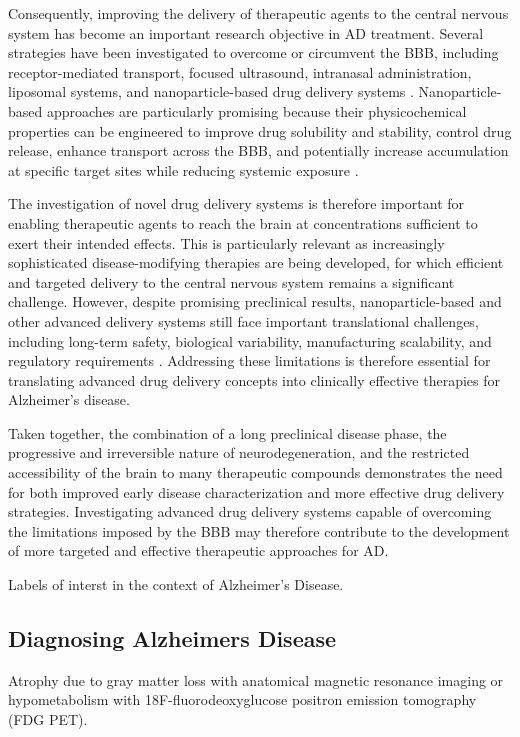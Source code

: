 Consequently, improving the delivery of therapeutic agents to the central nervous system has become an important research objective in AD treatment. Several strategies have been investigated to overcome or circumvent the BBB, including receptor-mediated transport, focused ultrasound, intranasal administration, liposomal systems, and nanoparticle-based drug delivery systems \cite{Iqbal_2024,DrugDelivery_BBB_AD_2025}. Nanoparticle-based approaches are particularly promising because their physicochemical properties can be engineered to improve drug solubility and stability, control drug release, enhance transport across the BBB, and potentially increase accumulation at specific target sites while reducing systemic exposure \cite{Roghani_2024,Roamcharern_2026}.

The investigation of novel drug delivery systems is therefore important for enabling therapeutic agents to reach the brain at concentrations sufficient to exert their intended effects. This is particularly relevant as increasingly sophisticated disease-modifying therapies are being developed, for which efficient and targeted delivery to the central nervous system remains a significant challenge. However, despite promising preclinical results, nanoparticle-based and other advanced delivery systems still face important translational challenges, including long-term safety, biological variability, manufacturing scalability, and regulatory requirements \cite{Roamcharern_2026}. Addressing these limitations is therefore essential for translating advanced drug delivery concepts into clinically effective therapies for Alzheimer’s disease.

Taken together, the combination of a long preclinical disease phase, the progressive and irreversible nature of neurodegeneration, and the restricted accessibility of the brain to many therapeutic compounds demonstrates the need for both improved early disease characterization and more effective drug delivery strategies. Investigating advanced drug delivery systems capable of overcoming the limitations imposed by the BBB may therefore contribute to the development of more targeted and effective therapeutic approaches for AD.


Labels of interst in the context of Alzheimer's Disease. 

\subsection{Diagnosing Alzheimers Disease}
\label{Diagnosing Alzheimers Disease}
Atrophy due to gray matter loss with anatomical magnetic resonance imaging or hypometabolism with 18F-fluorodeoxyglucose positron emission tomography (FDG PET). 

